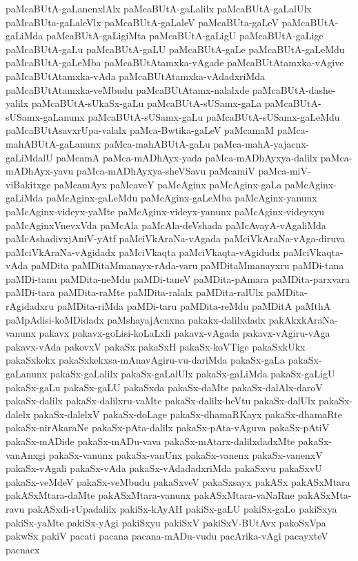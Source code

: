 {paMcaBUtA-gaLanenxlAlx
paMcaBUtA-gaLalilx
paMcaBUtA-gaLalUlx
paMcaBUta-gaLaleVlx
paMcaBUtA-gaLaleV
paMcaBUta-gaLeV
paMcaBUtA-gaLiMda
paMcaBUtA-gaLigiMta
paMcaBUtA-gaLigU
paMcaBUtA-gaLige
paMcaBUtA-gaLu
paMcaBUtA-gaLU
paMcaBUtA-gaLe
paMcaBUtA-gaLeMdu
paMcaBUtA-gaLeMba
paMcaBUtAtamxka-vAgade
paMcaBUtAtamxka-vAgive
paMcaBUtAtamxka-vAda
paMcaBUtAtamxka-vAdadxriMda
paMcaBUtAtamxka-veMbudu
paMcaBUtAtamx-nalalxde
paMcaBUtA-dashe-yalilx
paMcaBUtA-sUkaSx-gaLu
paMcaBUtA-sUSamx-gaLa
paMcaBUtA-sUSamx-gaLanunx
paMcaBUtA-sUSamx-gaLu
paMcaBUtA-sUSamx-gaLeMdu
paMcaBUtAsavxrUpa-valalx
paMca-Bwtika-gaLeV
paMcamaM
paMca-mahABUtA-gaLanunx
paMca-mahABUtA-gaLu
paMca-mahA-yajacnx-gaLiMdalU
paMcamA
paMca-mADhAyx-yada
paMca-mADhAyxya-dalilx
paMca-mADhAyx-yavu
paMca-mADhAyxya-sheVSavu
paMcamiV
paMca-miV-viBakitxge
paMcamAyx
paMcaveY
paMcAginx
paMcAginx-gaLa
paMcAginx-gaLiMda
paMcAginx-gaLeMdu
paMcAginx-gaLeMba
paMcAginx-yanunx
paMcAginx-videyx-yaMte
paMcAginx-videyx-yanunx
paMcAginx-videyxyu
paMcAginxVnevxVda
paMcAla
paMcAla-deVshada
paMcAvayA-vAgaliMda
paMcAshadivxjAniV-yAtf
paMciVkAraNa-vAgada
paMciVkAraNa-vAga-diruva
paMciVkAraNa-vAgidadx
paMciVkaqta
paMciVkaqta-vAgidudx
paMciVkaqta-vAda
paMDita
paMDitaMmanayx-rAda-varu
paMDitaMmanayxru
paMDi-tana
paMDi-tanu
paMDita-neMdu
paMDi-taneV
paMDita-pAmara
paMDita-parxvara
paMDi-tara
paMDita-raMte
paMDita-ralalx
paMDita-ralUlx
paMDita-rAgidadxru
paMDita-riMda
paMDi-taru
paMDita-reMdu
paMDitA
paMthA
paMpAdisi-koMDidadx
paMshayajAcnxna
pakakx-dalilxdadx
pakAkxkAraNa-vanunx
pakavx
pakavx-goLisi-koLaLxli
pakavx-vAgada
pakavx-vAgiru-vAga
pakavx-vAda
pakovxV
pakaSx
pakaSxH
pakaSx-koVTige
pakaSxkUkx
pakaSxkekx
pakaSxkekxsa-mAnavAgiru-vu-dariMda
pakaSx-gaLa
pakaSx-gaLanunx
pakaSx-gaLalilx
pakaSx-gaLalUlx
pakaSx-gaLiMda
pakaSx-gaLigU
pakaSx-gaLu
pakaSx-gaLU
pakaSxda
pakaSx-daMte
pakaSx-dalAlx-daroV
pakaSx-dalilx
pakaSx-dalilxru-vaMte
pakaSx-dalilx-heVtu
pakaSx-dalUlx
pakaSx-dalelx
pakaSx-dalelxV
pakaSx-doLage
pakaSx-dhamaRKayx
pakaSx-dhamaRte
pakaSx-nirAkaraNe
pakaSx-pAta-dalilx
pakaSx-pAta-vAguva
pakaSx-pAtiV
pakaSx-mADide
pakaSx-mADu-vava
pakaSx-mAtarx-dalilxdadxMte
pakaSx-vanAnxgi
pakaSx-vanunx
pakaSx-vanUnx
pakaSx-vanenx
pakaSx-vanenxV
pakaSx-vAgali
pakaSx-vAda
pakaSx-vAdadadxriMda
pakaSxvu
pakaSxvU
pakaSx-veMdeV
pakaSx-veMbudu
pakaSxveV
pakaSxsayx
pakASx
pakASxMtara
pakASxMtara-daMte
pakASxMtara-vanunx
pakASxMtara-vaNaRne
pakASxMta-ravu
pakASxdi-rUpadalilx
pakiSx-kAyAH
pakiSx-gaLU
pakiSx-gaLo
pakiSxya
pakiSx-yaMte
pakiSx-yAgi
pakiSxyu
pakiSxV
pakiSxV-BUtAvx
pakoSxVpa
pakwSx
pakiV
pacati
pacana
pacana-mADu-vudu
pacArika-vAgi
pacayxteV
pacnacx
}
